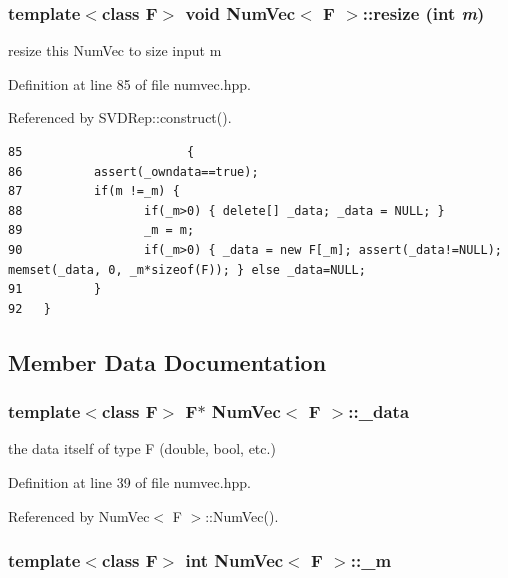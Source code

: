 \subsubsection{\setlength{\rightskip}{0pt plus 5cm}template$<$class F$>$ void {\bf Num\-Vec}$<$ F $>$::resize (int {\em m})\hspace{0.3cm}{\tt  [inline]}}\label{classNumVec_3ec52bb13fd53dffe925298f4b72a3e3_3ec52bb13fd53dffe925298f4b72a3e3}


resize this Num\-Vec to size input m 

Definition at line 85 of file numvec.hpp.

Referenced by SVDRep::construct().

\footnotesize\begin{verbatim}85                       {
86          assert(_owndata==true);
87          if(m !=_m) {
88                 if(_m>0) { delete[] _data; _data = NULL; }
89                 _m = m;
90                 if(_m>0) { _data = new F[_m]; assert(_data!=NULL);  memset(_data, 0, _m*sizeof(F)); } else _data=NULL;
91          }
92   }
\end{verbatim}\normalsize 




\subsection{Member Data Documentation}
\subsubsection{\setlength{\rightskip}{0pt plus 5cm}template$<$class F$>$ F$\ast$ {\bf Num\-Vec}$<$ F $>$::{\bf \_\-data}}\label{classNumVec_7125153abbcb2e949a1b4f81cbe22af5_7125153abbcb2e949a1b4f81cbe22af5}


the data itself of type F (double, bool, etc.) 

Definition at line 39 of file numvec.hpp.

Referenced by Num\-Vec$<$ F $>$::Num\-Vec().
\subsubsection{\setlength{\rightskip}{0pt plus 5cm}template$<$class F$>$ int {\bf Num\-Vec}$<$ F $>$::{\bf \_\-m}}\label{classNumVec_b781ae81625400d76d94420d3af2c230_b781ae81625400d76d94420d3af2c230}


